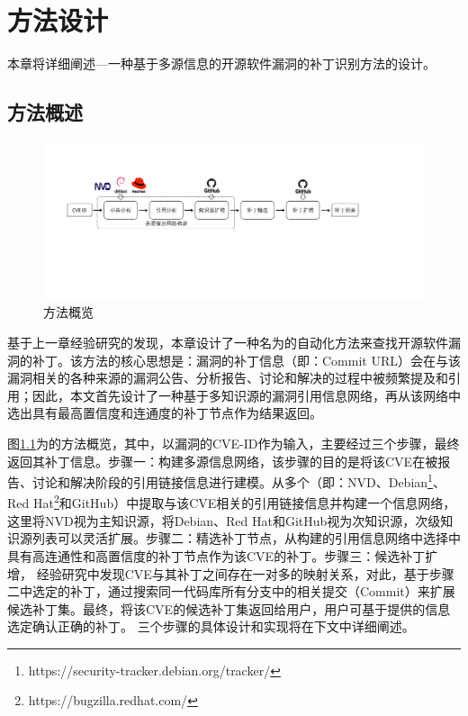 
\chapter{\tool 方法设计}

本章将详细阐述\tool ---一种基于多源信息的开源软件漏洞的补丁识别方法的设计。

\section{方法概述}
\begin{figure}[h]
    \centering
    \includegraphics[scale=0.40]{fig/overview.pdf}
    \caption{\tool 方法概览}\label{fig:overview}
\end{figure}

基于上一章经验研究的发现，本章设计了一种名为\tool 的自动化方法来查找开源软件漏洞的补丁。该方法的核心思想是：漏洞的补丁信息（即：Commit URL）会在与该漏洞相关的各种来源的漏洞公告、分析报告、讨论和解决的过程中被频繁提及和引用；因此，本文首先设计了一种基于多知识源的漏洞引用信息网络，再从该网络中选出具有最高置信度和连通度的补丁节点作为结果返回。

图\ref{fig:overview}为\tool 的方法概览，其中，\tool 以漏洞的CVE-ID作为输入，主要经过三个步骤，最终返回其补丁信息。步骤一：构建多源信息网络，该步骤的目的是将该CVE在被报告、讨论和解决阶段的引用链接信息进行建模。\tool 从多个（即：NVD、Debian\footnote{https://security-tracker.debian.org/tracker/}、Red Hat\footnote{https://bugzilla.redhat.com/}和GitHub）中提取与该CVE相关的引用链接信息并构建一个信息网络，这里将NVD视为主知识源，将Debian、Red Hat和GitHub视为次知识源，次级知识源列表可以灵活扩展。步骤二：精选补丁节点，\tool 从构建的引用信息网络中选择中具有高连通性和高置信度的补丁节点作为该CVE的补丁。步骤三：候选补丁扩增， 经验研究中发现CVE与其补丁之间存在一对多的映射关系，对此，基于步骤二中选定的补丁，\tool 通过搜索同一代码库所有分支中的相关提交（Commit）来扩展候选补丁集。最终，\tool 将该CVE的候选补丁集返回给用户，用户可基于\tool 提供的信息选定确认正确的补丁。%
三个步骤的具体设计和实现将在下文中详细阐述。

